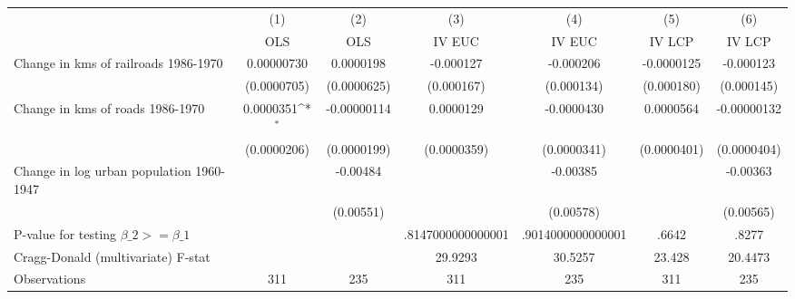 {
\def\sym#1{\ifmmode^{#1}\else\(^{#1}\)\fi}
\begin{tabular}{l*{6}{c}}
\hline\hline
                &\multicolumn{1}{c}{(1)}&\multicolumn{1}{c}{(2)}&\multicolumn{1}{c}{(3)}&\multicolumn{1}{c}{(4)}&\multicolumn{1}{c}{(5)}&\multicolumn{1}{c}{(6)}\\
                &\multicolumn{1}{c}{OLS}&\multicolumn{1}{c}{OLS}&\multicolumn{1}{c}{IV EUC}&\multicolumn{1}{c}{IV EUC}&\multicolumn{1}{c}{IV LCP}&\multicolumn{1}{c}{IV LCP}\\
\hline
Change in kms of railroads 1986-1970&0.00000730         &0.0000198         &-0.000127         &-0.000206         &-0.0000125         &-0.000123         \\
                &(0.0000705)         &(0.0000625)         &(0.000167)         &(0.000134)         &(0.000180)         &(0.000145)         \\
[1em]
Change in kms of roads 1986-1970&0.0000351\sym{*}  &-0.00000114         &0.0000129         &-0.0000430         &0.0000564         &-0.00000132         \\
                &(0.0000206)         &(0.0000199)         &(0.0000359)         &(0.0000341)         &(0.0000401)         &(0.0000404)         \\
[1em]
Change in log urban population 1960-1947&                  & -0.00484         &                  & -0.00385         &                  & -0.00363         \\
                &                  &(0.00551)         &                  &(0.00578)         &                  &(0.00565)         \\
\hline
P-value for testing $\beta\_{2} >= \beta\_{1}$&                  &                  &.8147000000000001         &.9014000000000001         &    .6642         &    .8277         \\
Cragg-Donald (multivariate) F-stat&                  &                  &  29.9293         &  30.5257         &   23.428         &  20.4473         \\
Observations    &      311         &      235         &      311         &      235         &      311         &      235         \\
\hline\hline
\end{tabular}
}
